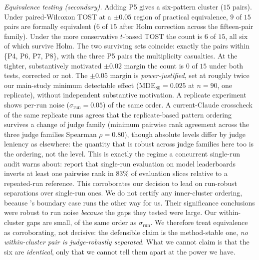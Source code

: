 \documentclass[11pt]{article}
\begin{document}
\emph{Equivalence testing (secondary).} Adding P5
gives a six-pattern cluster ($15$ pairs). Under paired-Wilcoxon TOST at a $\pm0.05$
region of practical equivalence, $9$ of $15$ pairs are formally equivalent ($6$ of $15$
after Holm correction across the fifteen-pair family). Under the more conservative
$t$-based TOST the count is $6$ of $15$, all six of which survive Holm. The two
surviving sets coincide: exactly the pairs within \{P4, P6, P7, P8\}, with the three P5
pairs the multiplicity casualties. At the tighter, substantively motivated $\pm0.02$
margin the count is $0$ of $15$ under both tests, corrected or not. The $\pm0.05$ margin
is \emph{power-justified}, set at roughly twice our main-study minimum detectable effect
($\text{MDE}_{80}=0.025$ at $n{=}90$, one replicate), without independent substantive
motivation. A replicate experiment shows per-run noise
($\sigma_{\text{run}}=0.05$) of the same order. A current-Claude crosscheck of the same
replicate runs agrees that the replicate-based pattern ordering survives a change of
judge family (minimum pairwise rank agreement across the three judge families Spearman
$\rho=0.80$), though absolute levels differ by judge leniency as elsewhere: the
quantity that is robust across judge families here too is the ordering, not the level. This is exactly the regime a concurrent single-run audit warns
about: \citet{alvarado2025repetitions} report that single-run evaluation on model
leaderboards inverts at least one pairwise rank in $83\%$ of evaluation slices relative
to a repeated-run reference. This corroborates our decision to lead on run-robust
separations over single-run ones. We do not certify any inner-cluster ordering, because
\citeauthor{alvarado2025repetitions}'s boundary case runs the other way for us. Their
significance conclusions were robust to run noise \emph{because} the gaps they tested
were large. Our within-cluster gaps are small, of the same order as
$\sigma_{\text{run}}$. We therefore
treat equivalence as corroborating, not decisive: the
defensible claim is the method-stable one, \emph{no within-cluster pair is
judge-robustly separated}. What we cannot claim is that the six are \emph{identical},
only that we cannot tell them apart at the power we have.
\end{document}
